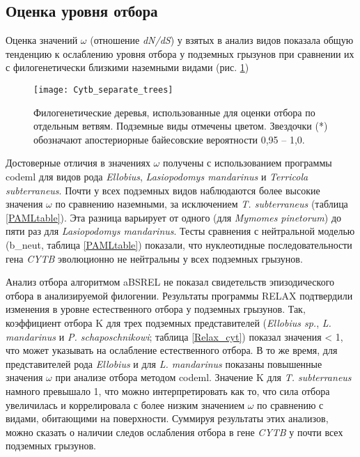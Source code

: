 
\subsection{Оценка уровня отбора}
Оценка значений $\omega$ (отношение \textit{dN/dS}) у взятых в анализ видов показала общую тенденцию к ослаблению уровня отбора у подземных грызунов при сравнении их с филогенетически близкими наземными видами (рис. \ref{Tree4Selection})


\begin{figure}[h!]
	\begin{center}
		\texttt{[image: Cytb\_separate\_trees]}
	\end{center}
	\caption{Филогенетические деревья, использованные для оценки отбора по отдельным ветвям. Подземные виды отмечены цветом. Звездочки (*) обозначают апостериорные байесовские вероятности 0,95 -- 1,0.} \label{Tree4Selection}
\end{figure}


 Достоверные отличия в значениях $\omega$ получены с использованием программы codeml для видов рода \textit{Ellobius}, \textit{Lasiopodomys mandarinus} и \textit{Terricola subterraneus}. Почти у всех подземных видов наблюдаются более высокие значения $\omega$ по сравнению наземными, за исключением \textit{T. subterraneus} (таблица \ref{PAMLtable}). Эта разница варьирует от одного (для \textit{Mymomes pinetorum}) до пяти раз для \textit{Lasiopodomys mandarinus}. Тесты сравнения с нейтральной моделью (b\_neut, таблица \ref{PAMLtable}) показали, что нуклеотидные последовательности гена \textit{CYTB} эволюционно не нейтральны у всех подземных грызунов. 

Анализ отбора алгоритмом aBSREL не показал свидетельств эпизодического отбора в анализируемой филогении. Результаты программы RELAX подтвердили изменения в уровне естественного отбора у подземных грызунов. Так, коэффициент отбора K для трех подземных представителей (\textit{Ellobius sp.}, \textit{L. mandarinus} и \textit{P. schaposchnikowi}; таблица \ref{Relax_cyt}) показал значения < 1, что может указывать на ослабление естественного отбора. В то же время, для представителей рода \textit{Ellobius} и для \textit{L. mandarinus} показаны повышенные значения $\omega$ при анализе отбора методом codeml. Значение K для \textit{T. subterraneus} намного превышало 1, что можно интерпретировать как то, что сила отбора увеличилась и коррелировала с более низким значением $\omega$ по сравнению с видами, обитающими на поверхности. Суммируя результаты этих анализов, можно сказать о наличии следов ослабления отбора в гене \textit{CYTB} у почти всех подземных грызунов.


